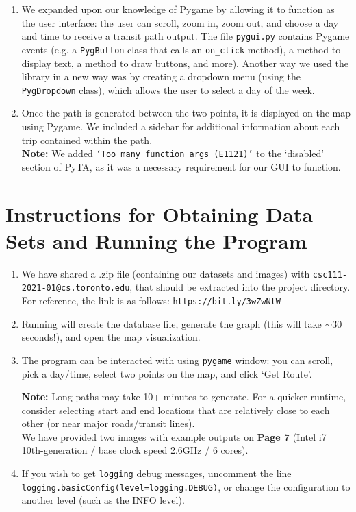 \documentclass[fontsize=11pt]{article}
\begin{document}
\begin{enumerate}
\begin{enumerate}
            \item We expanded upon our knowledge of Pygame by allowing it to function as the user interface: the user can scroll, zoom in, zoom out, and choose a day and time to receive a transit path output. The file \texttt{pygui.py} contains Pygame events (e.g. a \texttt{PygButton} class that calls an \texttt{on\_click} method), a method to display text, a method to draw buttons, and more). Another way we used the library in a new way was by creating a dropdown menu (using the \texttt{PygDropdown} class), which allows the user to select a day of the week. \\

            \item Once the path is generated between the two points, it is displayed on the map using Pygame. We included a sidebar for additional information about each trip contained within the path. \\

            \textbf{Note:} We added \texttt{`Too many function args (E1121)'} to the `disabled' section of PyTA, as it was a necessary requirement for our GUI to function.

        \end{enumerate}

    \end{enumerate}

    \section*{Instructions for Obtaining Data Sets and Running the Program}

    \begin{enumerate}
        \item We have shared a .zip file (containing our datasets and images) with \texttt{csc111-2021-01@cs.toronto.edu}, that should be extracted into the project directory. For reference, the link is as follows: \texttt{https://bit.ly/3wZwNtW}
        \item Running  will create the database file, generate the graph (this will take $\sim$30 seconds!), and open the map visualization.
        \item The program can be interacted with using \texttt{pygame} window: you can scroll, pick a day/time, select two points on the map, and click `Get Route'.

        \textbf{Note:} Long paths may take 10+ minutes to generate. For a quicker runtime, consider selecting start and end locations that are relatively close to each other (or near major roads/transit lines). \\
        We have provided two images with example outputs on \textbf{Page 7} (Intel i7 10th-generation / base clock speed 2.6GHz / 6 cores).

        \item If you wish to get \texttt{logging} debug messages, uncomment the line \texttt{logging.basicConfig(level=logging.DEBUG)}, or change the configuration to another level (such as the INFO level).
    \end{enumerate}
\end{document}
